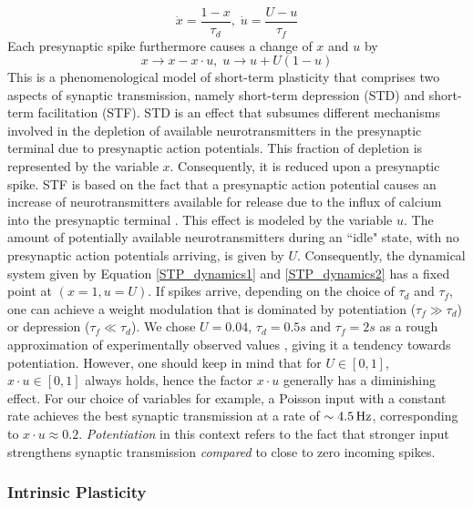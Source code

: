 \documentclass[10pt,a4paper]{article}
\begin{document}
\begin{equation}
\dot{x} = \frac{1-x}{\tau_d},\; \dot{u} = \frac{U-u}{\tau_f}
\label{STP_dynamics1}
\end{equation}
Each presynaptic spike furthermore causes a change of $x$ and $u$ by
\begin{equation}
x \rightarrow x - x\cdot u,\; u \rightarrow u + U(1-u)
\label{STP_dynamics2}
\end{equation}
This is a phenomenological model of short-term plasticity that comprises two aspects of synaptic transmission, namely short-term depression (STD) and short-term facilitation (STF). STD is an effect that subsumes different mechanisms involved in the depletion of available neurotransmitters in the presynaptic terminal due to presynaptic action potentials. This fraction of depletion is represented by the variable $x$. Consequently, it is reduced upon a presynaptic spike. STF is based on the fact that a presynaptic action potential causes an increase of neurotransmitters available for release due to the influx of calcium into the presynaptic terminal \cite{Katz_1967,Katz_1968}. This effect is modeled by the variable $u$. The amount of potentially available neurotransmitters during an ``idle" state, with no presynaptic action potentials arriving, is given by $U$. Consequently, the dynamical system given by Equation \eqref{STP_dynamics1} and \eqref{STP_dynamics2} has a fixed point at $(x=1,u=U)$. If spikes arrive, depending on the choice of $\tau_d$ and $\tau_f$, one can achieve a weight modulation that is dominated by potentiation ($\tau_f \gg \tau_d$) or depression ($\tau_f \ll \tau_d$). We chose $U=0.04$, $\tau_d = 0.5s$ and $\tau_f = 2s$ as a rough approximation of experimentally observed values \cite{Markram_STP}, giving it a tendency towards potentiation. However, one should keep in mind that for $U\in [0,1]$, $x\cdot u \in [0,1]$ always holds, hence the factor $x\cdot u$ generally has a diminishing effect. For our choice of variables for example, a Poisson input with a constant rate achieves the best synaptic transmission at a rate of $\sim \rm 4.5\, Hz$, corresponding to $x\cdot u \approx 0.2$. \textit{Potentiation} in this context refers to the fact that stronger input strengthens synaptic transmission \emph{compared} to close to zero incoming spikes.

\subsubsection{Intrinsic Plasticity}
\end{document}
